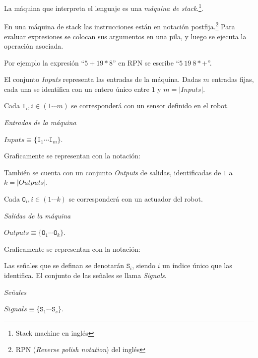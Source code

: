 
  La máquina que interpreta el lenguaje \alf{} es una
\textit{máquina de stack}.\footnote{Stack machine en inglés}.

  En una máquina de stack las instrucciones están en notación
postfija.\footnote{RPN (\textit{Reverse polish notation}) del inglés}
  Para evaluar expresiones se colocan sus argumentos en una pila, y luego
se ejecuta la operación asociada.
  
  Por ejemplo la expresión ``$5 + 19 * 8$'' en RPN se
escribe ``$5\ 19\ 8 * +$''.

  El conjunto \textit{Inputs} representa las entradas de la máquina.
  Dadas $m$ entradas fijas, cada una se identifica con un entero único
  entre $1$ y $m = | \textit{Inputs} |$.

  Cada $\texttt{I}_i, i \in (1 \dotsb m)$ se corresponderá con un sensor
  definido en el robot.

\begin{definicion}
  \textit{Entradas de la máquina}\\
  \begin{center}
    $\textit{Inputs} \equiv \{\texttt{I}_1 \dotsb \texttt{I}_m\}$.
  \end{center}
\end{definicion}
  
  Graficamente se representan con la notación:

  

  También se cuenta con un conjunto \textit{Outputs} de salidas,
  identificadas de $1$ a $k = | \textit{Outputs} |$.
  
  Cada $\texttt{O}_i, i \in (1 \dotsb k)$ se corresponderá con un actuador
  del robot.

\begin{definicion}
  \textit{Salidas de la máquina}\\
  \begin{center}
    $\textit{Outputs} \equiv \{\texttt{O}_1 \dotsb \texttt{O}_k\}$.
  \end{center}
\end{definicion}
  
  Graficamente se representan con la notación:

  

  Las señales que se definan se denotarán $\texttt{S}_i$, siendo $i$ un
  índice único que las identifica. El conjunto de las señales se llama
  \textit{Signals}.

\begin{definicion}
  \textit{Señales}
  \begin{center}
    $\textit{Signals} \equiv \{\texttt{S}_1 \dotsb \texttt{S}_s\}$.
  \end{center}
\end{definicion}


